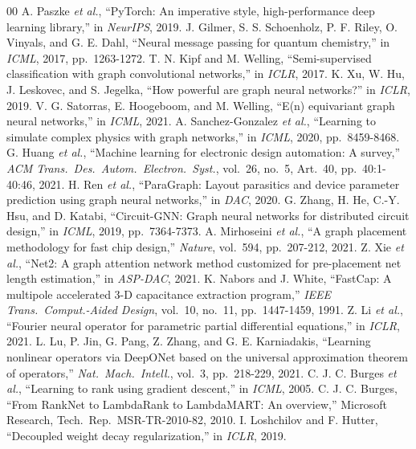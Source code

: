 \documentclass[letterpaper,twocolumn,9pt]{extarticle}
\begin{document}
{\begin{thebibliography}{00}
 A. Paszke \emph{et al.}, ``PyTorch: An imperative style,
high-performance deep learning library,'' in \emph{NeurIPS}, 2019.
 J. Gilmer, S. S. Schoenholz, P. F. Riley, O. Vinyals, and G. E.
Dahl, ``Neural message passing for quantum chemistry,'' in \emph{ICML}, 2017,
pp.\ 1263-1272.
 T. N. Kipf and M. Welling, ``Semi-supervised classification with
graph convolutional networks,'' in \emph{ICLR}, 2017.
 K. Xu, W. Hu, J. Leskovec, and S. Jegelka, ``How powerful are graph
neural networks?'' in \emph{ICLR}, 2019.
 V. G. Satorras, E. Hoogeboom, and M. Welling, ``E(n) equivariant
graph neural networks,'' in \emph{ICML}, 2021.
 A. Sanchez-Gonzalez \emph{et al.}, ``Learning to simulate complex
physics with graph networks,'' in \emph{ICML}, 2020, pp.\ 8459-8468.
 G. Huang \emph{et al.}, ``Machine learning for electronic
design automation: A survey,'' \emph{ACM Trans.\ Des.\ Autom.\ Electron.\ Syst.},
vol.\ 26, no.\ 5, Art.\ 40, pp.\ 40:1-40:46, 2021.
 H. Ren \emph{et al.}, ``ParaGraph: Layout parasitics and
device parameter prediction using graph neural networks,'' in \emph{DAC}, 2020.
 G. Zhang, H. He, C.-Y. Hsu, and D. Katabi, ``Circuit-GNN: Graph
neural networks for distributed circuit design,'' in \emph{ICML}, 2019, pp.\
7364-7373.
 A. Mirhoseini \emph{et al.}, ``A graph placement methodology
for fast chip design,'' \emph{Nature}, vol.\ 594, pp.\ 207-212, 2021.
\bibitem{net2} Z. Xie \emph{et al.}, ``Net2: A graph attention network method
customized for pre-placement net length estimation,'' in \emph{ASP-DAC}, 2021.
\bibitem{fastcap} K. Nabors and J. White, ``FastCap: A multipole accelerated 3-D
capacitance extraction program,'' \emph{IEEE Trans.\ Comput.-Aided Design},
vol.\ 10, no.\ 11, pp.\ 1447-1459, 1991.
 Z. Li \emph{et al.}, ``Fourier neural operator for parametric
partial differential equations,'' in \emph{ICLR}, 2021.
 L. Lu, P. Jin, G. Pang, Z. Zhang, and G. E. Karniadakis,
``Learning nonlinear operators via DeepONet based on the universal approximation
theorem of operators,'' \emph{Nat.\ Mach.\ Intell.}, vol.\ 3, pp.\ 218-229, 2021.
\bibitem{ranknet} C. J. C. Burges \emph{et al.}, ``Learning to rank using gradient
descent,'' in \emph{ICML}, 2005.
 C. J. C. Burges, ``From RankNet to LambdaRank to LambdaMART: An
overview,'' Microsoft Research, Tech.\ Rep.\ MSR-TR-2010-82, 2010.
\bibitem{adamw} I. Loshchilov and F. Hutter, ``Decoupled weight decay
regularization,'' in \emph{ICLR}, 2019.
\end{thebibliography}}
\end{document}
